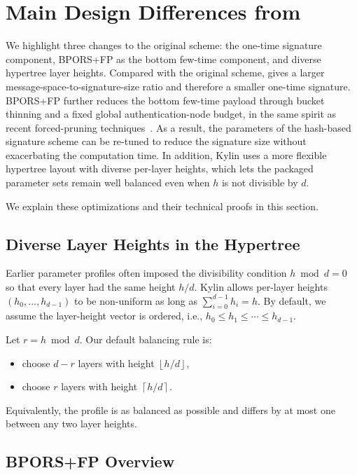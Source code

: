 \section{Main Design Differences from \SPHINCSP} \label{sec:balanced wotsp}\label{sec:wots-optimization}

We highlight three changes to the original \SPHINCSP scheme: the \WOTSCS
one-time signature component, BPORS+FP as the bottom few-time component, and
diverse hypertree layer heights.  Compared with the original \WOTSP scheme,
\WOTSCS gives a larger message-space-to-signature-size ratio and therefore a
smaller one-time signature.
BPORS+FP further reduces the bottom few-time payload through bucket thinning and
a fixed global authentication-node budget, in the same spirit as recent
forced-pruning techniques~\cite{bucketthinning,EPRINT:AbrKat25}.
As a result, the parameters of the hash-based signature scheme can be re-tuned
to reduce the signature size without exacerbating the computation time.  In
addition, Kylin uses a more flexible hypertree layout with diverse per-layer
heights, which lets the packaged parameter sets remain well balanced even when
$h$ is not divisible by $d$.

We explain these optimizations and their technical proofs in this section.

\subsection{Diverse Layer Heights in the Hypertree}

Earlier parameter profiles often imposed the divisibility condition $h \bmod d = 0$ so that every layer had the same height $h/d$. Kylin allows per-layer heights $(h_0,\ldots,h_{d-1})$ to be non-uniform as long as $\sum_{i=0}^{d-1} h_i = h$. By default, we assume the layer-height vector is ordered, i.e., $h_0 \le h_1 \le \cdots \le h_{d-1}$.

Let $r = h \bmod d$. Our default balancing rule is:
\begin{itemize}
    \item choose $d-r$ layers with height $\left\lfloor h/d \right\rfloor$,
    \item choose $r$ layers with height $\left\lceil h/d \right\rceil$.
\end{itemize}
Equivalently, the profile is as balanced as possible and differs by at most one between any two layer heights.

\subsection{BPORS+FP Overview}

